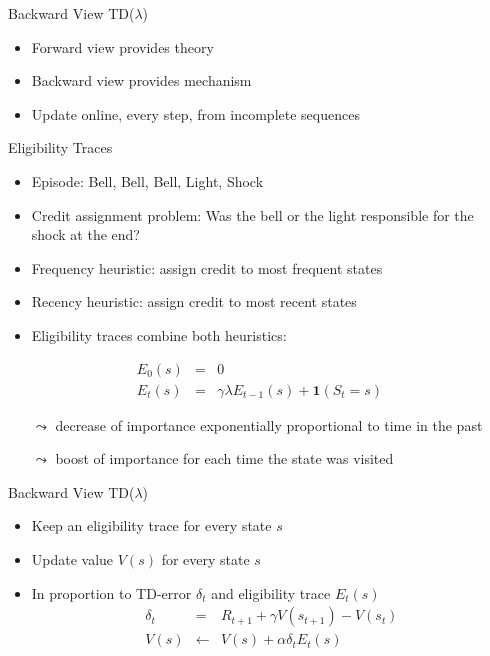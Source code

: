 \begin{frame}[c]{Backward View TD($\lambda$)}
	
	\begin{itemize}
		\item Forward view provides theory
		\item Backward view provides mechanism
		\item Update online, every step, from incomplete sequences
	\end{itemize}	
	
\end{frame}
\begin{frame}[c]{Eligibility Traces}
	
	\begin{itemize}
		\item Episode: Bell, Bell, Bell, Light, Shock
		\item Credit assignment problem: Was the bell or the light responsible for the shock at the end?
		\pause
		\item Frequency heuristic: assign credit to most frequent states
		\item Recency heuristic: assign credit to most recent states
		\item Eligibility traces combine both heuristics:
	\end{itemize}	

\begin{eqnarray}
E_0(s) &=& 0 \nonumber\\
E_t(s) &=& \gamma \lambda E_{t-1}(s) + \mathbf{1}(S_t=s) \nonumber
\end{eqnarray}

\begin{itemize}
	\item[$\leadsto$] decrease of importance exponentially proportional to time in the past
	\item[$\leadsto$] boost of importance for each time the state was visited
\end{itemize}
	
\end{frame}
\begin{frame}[c]{Backward View TD($\lambda$)}
	

\begin{itemize}
	\item Keep an eligibility trace for every state $s$
	\item Update value $V(s)$ for every state $s$
	\item In proportion to TD-error $\delta_t$ and eligibility trace $E_t(s)$
	\begin{eqnarray}
	\delta_t &=& R_{t+1} + \gamma V(s_{t+1}) - V(s_t)\nonumber\\
	V(s) &\gets& V(s) + \alpha \delta_t E_t(s)\nonumber
	\end{eqnarray}
\end{itemize}

\end{frame}
